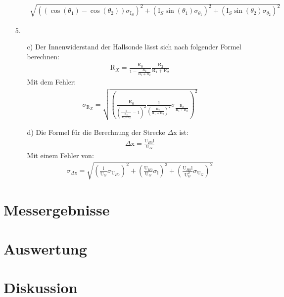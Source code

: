 \documentclass[12pt]{scrartcl}
\begin{document}
\begin{enumerate}
\begin{enumerate}
\begin{align}
\sqrt{\left((\cos(\theta_1) - \cos(\theta_2)) \sigma_{\text{I}_S}\right)^2+
\left(\text{I}_S \sin(\theta_1) \sigma_{\theta_1}\right)^2+
\left(\text{I}_S \sin(\theta_2) \sigma_{\theta_2}\right)^2}
\end{align}
\end{enumerate}
\item[5.]
\begin{enumerate}
\item[c)] Der Innenwiderstand der Hallsonde lässt sich nach folgender Formel berechnen:
\begin{align}
\text{R}_X = \frac{\text{R}_0}{1-\frac{\text{R}_2}{\text{R}_1+\text{R}_2}}\frac{\text{R}_2}{\text{R}_1+\text{R}_2}
\end{align}
Mit dem Fehler:
\begin{align}
\sigma_{\text{R}_X} = \sqrt{\left(\frac{\text{R}_0}{\left(\frac{1}{\frac{\text{R}_2}{\text{R}_1+\text{R}_2}}-1\right)^2}\frac{1}{\left(\frac{\text{R}_2}{\text{R}_1+
\text{R}_2}\right)^2}\sigma_{\frac{\text{R}_2}{\text{R}_1+\text{R}_2}}\right)^2}
\end{align}

\item[d)]
Die Formel für die Berechnung der Strecke $\Delta$x ist:
\begin{align}
\Delta \text{x} = \frac{\text{U}_{H0}\text{l}}{\text{U}_G}
\end{align}
Mit einem Fehler von:
\begin{align}
\sigma_{\Delta \text{x}} = \sqrt{
\left(\frac{\text{l}}{\text{U}_G}\sigma_{\text{U}_{H0}}\right)^2+
\left(\frac{\text{U}_{H0}}{\text{U}_G}\sigma_{\text{l}}\right)^2+
\left(\frac{\text{U}_{H0}\text{l}}{\text{U}_G^2}\sigma_{\text{U}_G}\right)^2}
\end{align}
\end{enumerate}

\end{enumerate}

\section{Messergebnisse}



\section{Auswertung}


\section{Diskussion}


\end{document}
